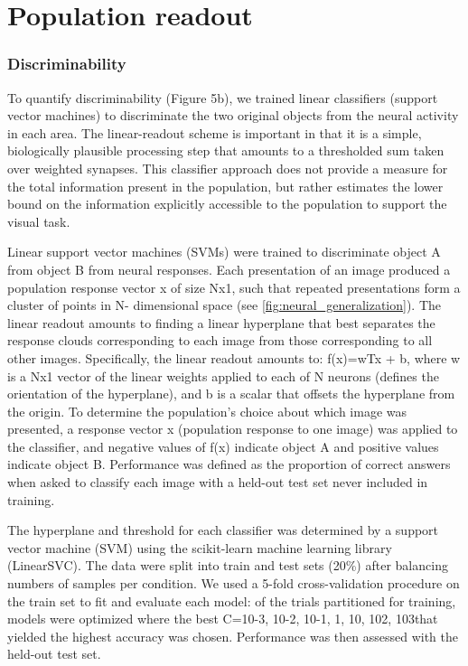 \section{Population readout}
\subsubsection{Discriminability}
To quantify discriminability (Figure 5b), we trained linear classifiers (support vector machines) to discriminate the two original objects from the neural activity in each area. The linear-readout scheme is important in that it is a simple, biologically plausible processing step that amounts to a thresholded sum taken over weighted synapses. This classifier approach does not provide a measure for the total information present in the population, but rather estimates the lower bound on the information explicitly accessible to the population to support the visual task\cite{Hung2005, Rust2010}.

Linear support vector machines (SVMs) were trained to discriminate object A from object B from neural responses. Each presentation of an image produced a population response vector x of size Nx1, such that repeated presentations form a cluster of points in N- dimensional space (see \ref{fig:neural_generalization}). The linear readout amounts to finding a linear hyperplane that best separates the response clouds corresponding to each image from those corresponding to all other images. Specifically, the linear readout amounts to: f(x)=wTx + b, where w is a Nx1 vector of the linear weights applied to each of N neurons (defines the orientation of the hyperplane), and b is a scalar that offsets the hyperplane from the origin. To determine the population’s choice about which image was presented, a response vector x (population response to one image) was applied to the classifier, and negative values of f(x) indicate object A and positive values indicate object B. Performance was defined as the proportion of correct answers when asked to classify each image with a held-out test set never included in training. 

The hyperplane and threshold for each classifier was determined by a support vector machine (SVM) using the scikit-learn machine learning library (LinearSVC\cite{Pedregosa2011}). The data were split into train and test sets (20\%) after balancing numbers of samples per condition. We used a 5-fold cross-validation procedure on the train set to fit and evaluate each model:  of the trials partitioned for training, models were optimized where the best C={10-3, 10-2, 10-1, 1, 10, 102, 103}that yielded the highest accuracy was chosen. Performance was then assessed with the held-out test set. 

